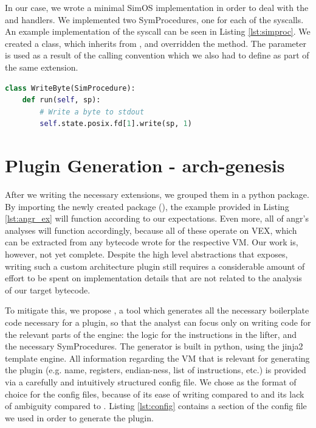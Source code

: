 In our case, we wrote a minimal SimOS implementation in order to deal with the  and  handlers. We implemented two SymProcedures, one for each of the \glspl{syscall}. An example implementation of the  \gls{syscall} can be seen in Listing \ref{lst:simproc}. We created a class, which inherits from , and overridden the  method. The parameter  is used as a result of the calling convention which we also had to define as part of the same extension.

\begin{lstlisting}[language=python, label={lst:simproc}, caption={TODO}]
class WriteByte(SimProcedure):
    def run(self, sp):
        # Write a byte to stdout
        self.state.posix.fd[1].write(sp, 1) 
\end{lstlisting}

\section{Plugin Generation - arch-genesis}

After we writing the necessary extensions, we grouped them in a python package. By importing the newly created package (), the example provided in Listing \ref{lst:angr_ex} will function according to our expectations. Even more, all of angr's analyses will function accordingly, because all of these operate on VEX, which can be extracted from any bytecode wrote for the respective \gls{VM}. Our work is, however, not yet complete. Despite the high level abstractions that  exposes, writing such a custom architecture plugin still requires a considerable amount of effort to be spent on implementation details that are not related to the analysis of our target bytecode.

To mitigate this, we propose , a tool which generates all the necessary boilerplate code necessary for a plugin, so that the analyst can focus only on writing code for the relevant parts of the engine: the logic for the instructions in the lifter, and the necessary SymProcedures. The generator is built in python, using the jinja2 \cite{jinja} template engine. All information regarding the \gls{VM} that is relevant for generating the plugin (e.g. name, registers, endian-ness, list of instructions, etc.) is provided via a carefully and intuitively structured config file. We chose  \cite{toml} as the format of choice for the config files, because of its ease of writing compared to  and its lack of ambiguity compared to . Listing \ref{lst:config} contains a section of the config file we used in order to generate the  plugin.

